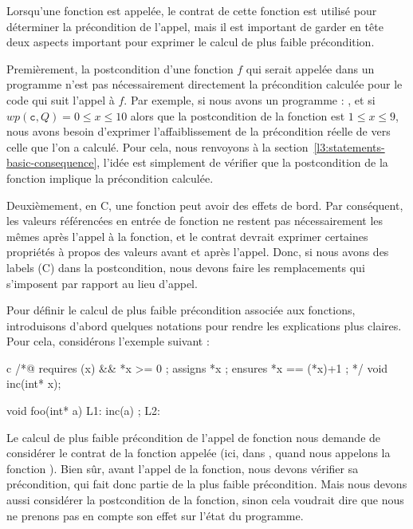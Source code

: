 

Lorsqu'une fonction est appelée, le contrat de cette fonction est utilisé pour
déterminer la précondition de l'appel, mais il est important de garder en tête deux
aspects important pour exprimer le calcul de plus faible précondition.


Premièrement, la postcondition d'une fonction $f$ qui serait appelée dans un
programme n'est pas nécessairement directement la précondition calculée pour le code
qui suit l'appel à $f$. Par exemple, si nous avons un programme :
, et si $wp(\texttt{c}, Q) = 0 \leq x \leq 10$ alors que
la postcondition de la fonction  est $1 \leq x \leq 9$, nous avons
besoin d'exprimer l'affaiblissement de la précondition réelle de 
vers celle que l'on a calculé. Pour cela, nous renvoyons à la
section~\ref{l3:statements-basic-consequence}, l'idée est simplement de vérifier
que la postcondition de la fonction implique la précondition calculée.



Deuxièmement, en C, une fonction peut avoir des effets de bord. Par conséquent, les
valeurs référencées en entrée de fonction ne restent pas nécessairement les mêmes
après l'appel à la fonction, et le contrat devrait exprimer certaines propriétés à
propos des valeurs avant et après l'appel. Donc, si nous avons des labels (C) dans
la postcondition, nous devons faire les remplacements qui s'imposent par rapport au
lieu d'appel.



Pour définir le calcul de plus faible précondition associée aux fonctions, introduisons
d'abord quelques notations pour rendre les explications plus claires. Pour cela,
considérons l'exemple suivant :

\begin{CodeBlock}{c}
/*@ requires \valid(x) && *x >= 0 ;
    assigns *x ;
    ensures *x == \old(*x)+1 ; */
void inc(int* x);

void foo(int* a){
  L1:
  inc(a) ;
  L2:
}
\end{CodeBlock}


Le calcul de plus faible précondition de l'appel de fonction nous demande de
considérer le contrat de la fonction appelée (ici, dans , quand
nous appelons la fonction ). Bien sûr, avant l'appel de la fonction,
nous devons vérifier sa précondition, qui fait donc partie de la plus faible
précondition. Mais nous devons aussi considérer la postcondition de la fonction,
sinon cela voudrait dire que nous ne prenons pas en compte son effet sur l'état du
programme.


